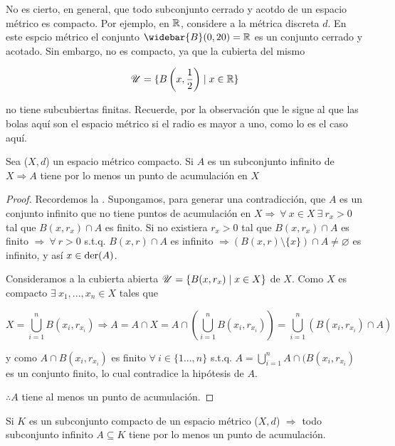 \begin{remark}
    No es cierto, en general, que todo subconjunto cerrado y acotdo de un espacio métrico es compacto. Por ejemplo, en $\mathbb{R}$, considere a la métrica discreta $d$. En este espcio métrico el conjunto $\widebar{B}(0,20) = \R$ es un conjunto cerrado y acotado. Sin embargo, no es compacto, ya que la cubierta del mismo

    $$\mathscr{U} = \{ B\left(x, \frac{1}{2} \right) \mid x \in \mathbb{R} \}$$

    no tiene subcubiertas finitas. Recuerde, por la observación que le sigue al  que las bolas aquí son el espacio métrico si el radio es mayor a uno, como lo es el caso aquí. 
\end{remark}

\begin{theorem} \label{theom334}
    Sea ($X,d$) un espacio métrico compacto. Si $A$ es un subconjunto infinito de $X \Rightarrow A$ tiene por lo menos un punto de acumulación en $X$
\end{theorem}

\begin{proof}
    Recordemos la . Supongamos, para generar una contradicción, que $A$ es un conjunto infinito que no tiene puntos de acumulación en $X \Rightarrow \: \forall \: x \in X \: \exists \: r_x > 0$ tal que $B(x,r_x) \cap A$ es finito. Si no existiera $r_x >0$ tal que $B(x,r_x) \cap A$ es finito $\Rightarrow \: \forall \: r > 0$ s.t.q. $B(x,r) \cap A$ es infinito $\Rightarrow (B(x,r) \setminus \{ x \}) \cap A \neq \varnothing$ es infinito, y así $x \in \mathrm{der}(A)$.

    Consideramos a la cubierta abierta $\mathscr{U} = \{ B(x,r_x) \mid x \in X \}$ de $X$. Como $X$ es compacto $\exists \: x_1, ..., x_n \in X$ tales que

    $$X = \bigcup_{i=1}^{n}B(x_i,r_{x_i}) \Rightarrow A = A \cap X = A \cap \left( \bigcup_{i=1}^{n}B(x_i,r_{x_i}) \right) = \bigcup_{i=1}^{n} \left(B(x_i,r_{x_i}) \cap A \right)$$

    y como $A \cap B(x_i,r_{x_i})$ es finito $\forall \: i \in \{ 1 ..., n \}$ s.t.q. $A =\bigcup_{i=1}^{n} A \cap  (B(x_i,r_{x_i})$ es un conjunto finito, lo cual contradice la hipótesis de $A$.

    $\therefore A$ tiene al menos un punto de acumulación.
\end{proof}

\begin{corollary}
    Si $K$ es un subconjunto compacto de un espacio métrico ($X,d$) $\Rightarrow$ todo subconjunto infinito $A \subseteq K$ tiene por lo menos un punto de acumulación.
\end{corollary}

